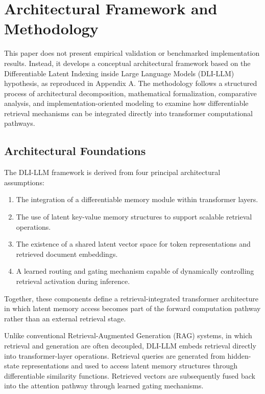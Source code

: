 \documentclass[
]{article}
\begin{document}
\hypertarget{architectural-framework-and-methodology}{%
\section{Architectural Framework and
Methodology}\label{architectural-framework-and-methodology}}

This paper does not present empirical validation or benchmarked
implementation results. Instead, it develops a conceptual architectural
framework based on the Differentiable Latent Indexing inside Large
Language Models (DLI-LLM) hypothesis, as reproduced in Appendix A. The
methodology follows a structured process of architectural decomposition,
mathematical formalization, comparative analysis, and
implementation-oriented modeling to examine how differentiable retrieval
mechanisms can be integrated directly into transformer computational
pathways.

\hypertarget{architectural-foundations}{%
\subsection{Architectural Foundations}\label{architectural-foundations}}

The DLI-LLM framework is derived from four principal architectural
assumptions:

\begin{enumerate}
\def\labelenumi{\Alph{enumi}.}
\item
  The integration of a differentiable memory module within transformer
  layers.
\item
  The use of latent key-value memory structures to support scalable
  retrieval operations.
\item
  The existence of a shared latent vector space for token
  representations and retrieved document embeddings.
\item
  A learned routing and gating mechanism capable of dynamically
  controlling retrieval activation during inference.
\end{enumerate}

Together, these components define a retrieval-integrated transformer
architecture in which latent memory access becomes part of the forward
computation pathway rather than an external retrieval stage.

Unlike conventional Retrieval-Augmented Generation (RAG) systems, in
which retrieval and generation are often decoupled, DLI-LLM embeds
retrieval directly into transformer-layer operations. Retrieval queries
are generated from hidden-state representations and used to access
latent memory structures through differentiable similarity functions.
Retrieved vectors are subsequently fused back into the attention pathway
through learned gating mechanisms.
\end{document}

